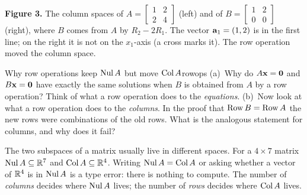 \documentclass[11pt]{article}
\begin{document}
\begin{center}
\end{center}

\textbf{Figure 3.} The column spaces of $A=\begin{bmatrix}1&2\\2&4\end{bmatrix}$ (left) and of $B=\begin{bmatrix}1&2\\0&0\end{bmatrix}$ (right), where $B$ comes from $A$ by $R_2-2R_1$. The vector $\mathbf{a}_1=(1,2)$ is in the first line; on the right it is not on the $x_1$-axis (a cross marks it). The row operation moved the column space.

\begin{think}{Why row operations keep $\operatorname{Nul} A$ but move $\operatorname{Col} A$}{rowops}
(a)~Why do $A\mathbf{x}=\mathbf{0}$ and $B\mathbf{x}=\mathbf{0}$ have exactly the same solutions when $B$ is obtained from $A$ by a row operation? Think of what a row operation does to the \emph{equations}. (b)~Now look at what a row operation does to the \emph{columns}. In the proof that $\operatorname{Row} B=\operatorname{Row} A$ the new rows were combinations of the old rows. What is the analogous statement for columns, and why does it fail?
\end{think}

\begin{warn}
The two subspaces of a matrix usually live in different spaces. For a $4\times7$ matrix $\operatorname{Nul} A\subseteq\mathbb{R}^7$ and $\operatorname{Col} A\subseteq\mathbb{R}^4$. Writing $\operatorname{Nul} A=\operatorname{Col} A$ or asking whether a vector of $\mathbb{R}^4$ is in $\operatorname{Nul} A$ is a type error: there is nothing to compute. The number of \emph{columns} decides where $\operatorname{Nul} A$ lives; the number of \emph{rows} decides where $\operatorname{Col} A$ lives.
\end{warn}
\end{document}
